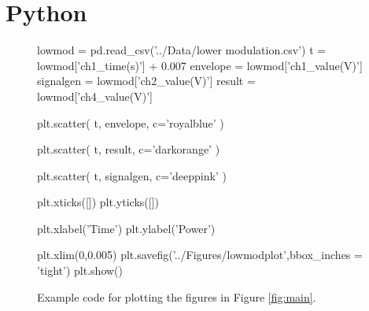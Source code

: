 \documentclass[aps,prl,reprint,10pt,amsmath,amssymb,superscriptaddress,a4paper]{revtex4-2}
\begin{document}
\begin{figure}[!htbp]
\end{figure}

\section{Python}
\begin{figure}[!htbp]
    \begin{python}
    lowmod = pd.read_csv('../Data/lower modulation.csv')
    t = lowmod['ch1_time(s)'] + 0.007
    envelope = lowmod['ch1_value(V)']
    signalgen = lowmod['ch2_value(V)']
    result = lowmod['ch4_value(V)']

    plt.scatter(
        t,
        envelope,
        c='royalblue'
    )

    plt.scatter(
        t,
        result,
        c='darkorange'
    )

    plt.scatter(
        t,
        signalgen,
        c='deeppink'
    )

    plt.xticks([])
    plt.yticks([])

    plt.xlabel('Time')
    plt.ylabel('Power')

    plt.xlim(0,0.005)
    plt.savefig('../Figures/lowmodplot',bbox_inches = 'tight')
    plt.show()
    \end{python}
    \caption{Example code for plotting the figures in Figure \ref{fig:main}.}
\end{figure}
\end{document}
